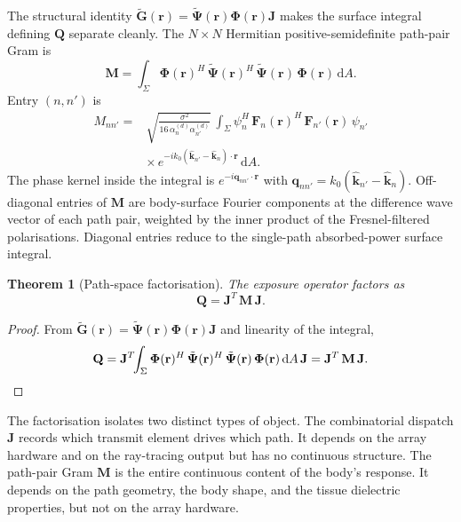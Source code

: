 \documentclass[journal,twocolumn,10pt]{IEEEtran}
\theoremstyle{plain}
\newtheorem{theorem}{Theorem}
\theoremstyle{remark}
\newcommand{\khat}{\hat{\bm{k}}}
\newcommand{\rr}{\mathbf{r}}
\newcommand{\Gtil}{\tilde{\mathbf{G}}}
\newcommand{\Qmat}{\mathbf{Q}}
\newcommand{\Mmat}{\mathbf{M}}
\newcommand{\Jmat}{\mathbf{J}}
\newcommand{\Phimat}{\mathbf{\Phi}}
\newcommand{\Psitil}{\tilde{\bm{\Psi}}}
\newcommand{\Fn}{\mathbf{F}_n}
\newcommand{\diff}{\mathrm{d}}
\begin{document}
The structural identity
$\Gtil(\rr) = \Psitil(\rr) \Phimat(\rr) \Jmat$ makes the surface
integral defining $\Qmat$ separate cleanly. The $N \times N$
Hermitian positive-semidefinite path-pair Gram is
\begin{equation}\label{eq:M-def}
  \Mmat = \int_\Sigma \Phimat(\rr)^H\,\Psitil(\rr)^H\,
  \Psitil(\rr)\,\Phimat(\rr)\,\diff A.
\end{equation}
Entry $(n, n')$ is
\begin{equation}\label{eq:M-entry}
\begin{aligned}
  M_{nn'} = {}& \sqrt{\frac{\sigma^2}{16\,\alpha_n^{(d)}\alpha_{n'}^{(d)}}}\,
  \int_\Sigma \psi_n^H\,\Fn(\rr)^H\,\mathbf{F}_{n'}(\rr)\,\psi_{n'} \\
  &\times\,e^{-i k_0 (\khat_{n'} - \khat_n) \cdot \rr}\,\diff A.
\end{aligned}
\end{equation}
The phase kernel inside the integral is $e^{-i \mathbf{q}_{nn'}
\cdot \rr}$ with $\mathbf{q}_{nn'} = k_0(\khat_{n'} - \khat_n)$.
Off-diagonal entries of $\Mmat$ are body-surface Fourier components
at the difference wave vector of each path pair, weighted by the
inner product of the Fresnel-filtered polarisations. Diagonal
entries reduce to the single-path absorbed-power surface integral.

\begin{theorem}[Path-space factorisation]\label{thm:Q-factor}
The exposure operator factors as
\begin{equation}\label{eq:Q-factor}
  \Qmat = \Jmat^T\,\Mmat\,\Jmat.
\end{equation}
\end{theorem}

\begin{proof}
From $\Gtil(\rr) = \Psitil(\rr)\Phimat(\rr)\Jmat$ and linearity of
the integral,
\begin{equation*}
  \Qmat
  = \Jmat^T \!\!\int_\Sigma \Phimat(\rr)^H\,\Psitil(\rr)^H\,
  \Psitil(\rr)\,\Phimat(\rr)\,\diff A\,\Jmat
  = \Jmat^T\,\Mmat\,\Jmat. \qedhere
\end{equation*}
\end{proof}

The factorisation isolates two distinct types of object. The
combinatorial dispatch $\Jmat$ records which transmit element drives
which path. It depends on the array hardware and on the ray-tracing
output but has no continuous structure. The path-pair Gram $\Mmat$
is the entire continuous content of the body's response. It depends
on the path geometry, the body shape, and the tissue dielectric
properties, but not on the array hardware.
\end{document}
